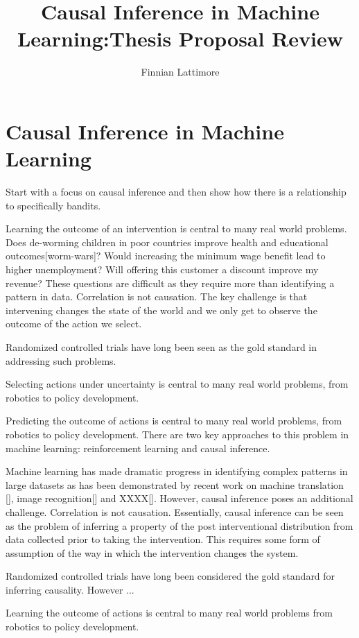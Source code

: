 \documentclass[11pt,a4paper]{article}
\author{Finnian Lattimore}
\title{Causal Inference in Machine Learning:Thesis Proposal Review}
\begin{document}
\def\ci{\perp\!\!\!\perp} %
\newtheorem{theorem}{Theorem}[section]
\newtheorem{definition}{Definition}[section]
\section*{Causal Inference in Machine Learning}

Start with a focus on causal inference and then show how there is a relationship to specifically bandits.

Learning the outcome of an intervention is central to many real world problems. Does de-worming children in poor countries improve health and educational outcomes[worm-wars]? Would increasing the minimum wage benefit lead to higher unemployment? Will offering this customer a discount improve my revenue? These questions are difficult as they require more than identifying a pattern in data. Correlation is not causation. The key challenge is that intervening changes the state of the world and we only get to observe the outcome of the action we select. 

Randomized controlled trials have long been seen as the gold standard in addressing such problems. 




Selecting actions under uncertainty is central to many real world problems, from robotics to policy development. 

Predicting the outcome of actions is central to many real world problems, from robotics to policy development. There are two key approaches to this problem in machine learning: reinforcement learning and causal inference. 





Machine learning has made dramatic progress in identifying complex patterns in large datasets as has been demonstrated by recent work on machine translation [], image recognition[] and XXXX[]. However, causal inference poses an additional challenge. Correlation is not causation. Essentially, causal inference can be seen as the problem of inferring a property of the post interventional distribution from data collected prior to taking the intervention. This requires some form of assumption of the way in which the intervention changes the system.




Randomized controlled trials have long been considered the gold standard for inferring causality. However ...


Learning the outcome of actions is central to many real world problems from robotics to policy development. 
\end{document}
